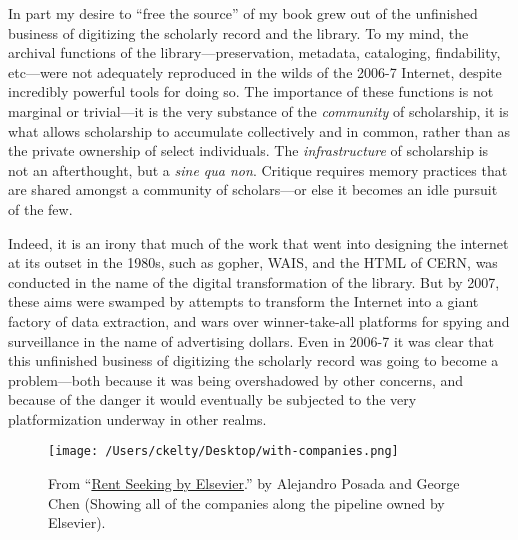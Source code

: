 \documentclass[11pt]{article}
\begin{document}
In part my desire to ``free the source'' of my book grew out of the unfinished business of digitizing the scholarly record and the library.  To my mind, the archival functions of the library---preservation, metadata, cataloging, findability, etc---were not adequately reproduced in the wilds of the 2006-7 Internet, despite incredibly powerful tools for doing so. The importance of these functions is not marginal or trivial---it is the very substance of the \emph{community} of scholarship, it is what allows scholarship to accumulate collectively and in common, rather than as the private ownership of select individuals. The \emph{infrastructure} of scholarship is not an afterthought, but a \emph{sine qua non}.  Critique requires memory practices that are shared amongst a community of scholars---or else it becomes an idle pursuit of the few. 

Indeed, it is an irony that much of the work that went into designing the internet at its outset in the 1980s, such as gopher, WAIS, and the HTML of CERN, was conducted in the name of the digital transformation of the library.  But by 2007, these aims were swamped by attempts to transform the Internet into a giant factory of data extraction, and wars over winner-take-all platforms for spying and surveillance in the name of advertising dollars.  Even in 2006-7 it was clear that this unfinished business of digitizing the scholarly record was going to become a problem---both because it was being overshadowed by other concerns, and because of the danger it would eventually be subjected to the very platformization underway in other realms. 

\begin{figure}[htbp]
\centering
\texttt{[image: /Users/ckelty/Desktop/with-companies.png]}
\caption{\label{fig:orgc620f36}
From ``\href{http://knowledgegap.org/index.php/sub-projects/rent-seeking-and-financialization-of-the-academic-publishing-industry/preliminary-findings/}{Rent Seeking by Elsevier}.'' by Alejandro Posada and George Chen (Showing all of the companies along the pipeline owned by Elsevier).}
\end{figure}
\end{document}
